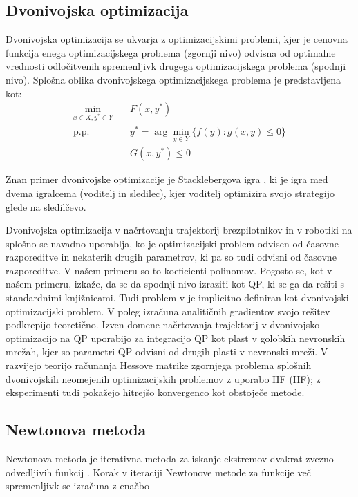 \documentclass[mat2, tisk]{fmfdelo}
\begin{document}
\subsection{Dvonivojska optimizacija}
Dvonivojska optimizacija se ukvarja z optimizacijskimi problemi, kjer je cenovna funkcija enega optimizacijskega problema (zgornji nivo) odvisna od optimalne vrednosti odločitvenih spremenljivk drugega optimizacijskega problema (spodnji nivo). Splošna oblika dvonivojskega optimizacijskega problema je predstavljena kot:
\begin{equation}
    \begin{aligned}
        \min_{x\in X, y^*\in Y}& \quad F(x,y^*) \\
        \text{p.p.} & \quad y^* = \arg \min_{y\in Y} \{f(y) : g(x,y) \leq 0\} \\
        &\quad G(x,y^*) \leq 0
    \end{aligned}
\end{equation}

Znan primer dvonivojske optimizacije je Stacklebergova igra \cite{stackelberg1934marktform}, ki je igra med dvema igralcema (voditelj in sledilec), kjer voditelj optimizira svojo strategijo glede na sledilčevo. 

Dvonivojska optimizacija v načrtovanju trajektorij brezpilotnikov in v robotiki na splošno se navadno uporablja, ko je optimizacijski problem odvisen od časovne razporeditve in nekaterih drugih parametrov, ki pa so tudi odvisni od časovne razporeditve. V našem primeru so to koeficienti polinomov. Pogosto se, kot v našem primeru, izkaže, da se da spodnji nivo izraziti kot \ac{QP}, ki se ga da rešiti s standardnimi knjižnicami. Tudi problem v \cite{mellinger2011minimum} je implicitno definiran kot dvonivojski optimizacijski problem. V \cite{sun2021fast} poleg izračuna analitičnih gradientov svojo rešitev podkrepijo teoretično. Izven domene načrtovanja trajektorij v \cite{amos2017optnet} dvonivojsko optimizacijo na \ac{QP} uporabijo za integracijo \ac{QP} kot plast v golobkih nevronskih mrežah, kjer so parametri \ac{QP} odvisni od drugih plasti v nevronski mreži. V \cite{dyro2022second} razvijejo teorijo računanja Hessove matrike zgornjega problema splošnih dvonivojskih neomejenih optimizacijskih problemov z uporabo \acl{IIF} (\acs{IIF}); z eksperimenti tudi pokažejo hitrejšo konvergenco kot obstoječe metode.

\subsection{Newtonova metoda}
Newtonova metoda je iterativna metoda za iskanje ekstremov dvakrat zvezno odvedljivih funkcij \cite{newton1736method, boyd2004convex}. Korak v iteraciji Newtonove metode za funkcije več spremenljivk se izračuna z enačbo
\end{document}
